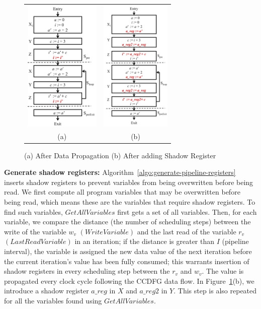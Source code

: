 \begin{figure}[t!]
\begin{center}
\begin{tabular}{cc}
\includegraphics[height=2.5in]{fig-proposal/algorithm-after-data-propagation-2}
&
\includegraphics[height=2.5in]{fig-proposal/algorithm-after-shadow-register}
\\
(a) & (b)
\\
\end{tabular}
\end{center}
\caption{(a) After Data Propagation (b) After adding Shadow Register}
\label{fig:algo2-2}
\end{figure}

{\bf Generate shadow registers:} Algorithm~\ref{algo:generate-pipeline-registers} inserts shadow registers
to prevent variables from being overwritten before being read. We first compute all program variables that may be
overwritten before being read, which means these are the variables that require shadow registers. To find such variables,
 $GetAllVariables$ first gets a set of all variables. Then, for each variable, we compare the distance (the number of scheduling steps) between the write of
  the variable $w_v$ $(WriteVariable)$ and the last read of the variable $r_v$ $(LastReadVariable)$ in an iteration; if the
   distance is greater than $I$ (pipeline interval), the variable is assigned the new data value of the next iteration before the current iteration's value
    has been fully consumed; this warrants insertion of shadow registers in every scheduling step between the $r_v$ and $w_v$. The value is propagated every clock cycle following the CCDFG data flow. In Figure~\ref{fig:algo2-2}(b), we introduce a shadow register $a\_reg$ in $X$ and $a\_reg2$ in $Y$. This step is also repeated for all the variables found using $GetAllVariables$.


